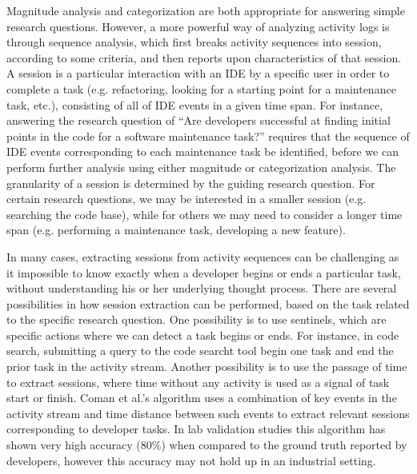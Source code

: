 Magnitude analysis and categorization are both appropriate for answering simple research questions. However, a more powerful way of analyzing activity logs is through sequence analysis, which first breaks activity sequences into session, according to some criteria, and then reports upon characteristics of that session. A session is a particular interaction with an IDE by a specific user in order to complete a task (e.g. refactoring, looking for a starting point for a maintenance task, etc.), consisting of all of IDE events in a given time span.
For instance, answering the research question of ``Are developers successful at finding initial points in the code for a software maintenance task?'' requires that the sequence of IDE events corresponding to each maintenance task be identified, before we can perform further analysis using either magnitude or categorization analysis. The granularity of a session is determined by the guiding research question. For certain research questions, we may be interested in a smaller session (e.g. searching the code base), while for others we may need to consider a longer time span (e.g. performing a maintenance task, developing a new feature). 

In many cases, extracting sessions from activity sequences can be challenging as it impossible to know exactly when a developer begins or ends a particular task, without understanding his or her underlying thought process. There are several possibilities in how session extraction can be performed, based on the task related to the specific research question. One possibility is to use sentinels, which are specific actions where we can detect a task begins or ends. For instance, in code search, submitting a query to the code searcht tool begin one task and end the prior task in the activity stream. Another possibility is to use the passage of time to extract sessions, where time without any activity is used as a signal of task start or finish. Coman et al.'s \cite{Coman-TaskIdent} algorithm uses a combination of key events in the activity stream and time distance between such events to extract relevant sessions corresponding to developer tasks. In lab validation studies this algorithm has shown very high accuracy (80\%) when compared to the ground truth reported by developers, however this accuracy may not hold up in an industrial setting\cite{Zou-ComanIndustry}.


